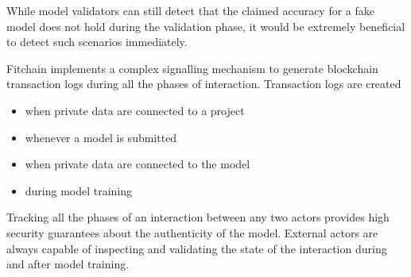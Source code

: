\documentclass[12pt, a4paper,titlepage]{extreport}
\begin{document}
While model validators can still detect that the claimed accuracy for a fake model does not hold during the validation phase, it would be extremely beneficial to detect such scenarios immediately. 

Fitchain implements a complex signalling mechanism to generate blockchain transaction logs during all the phases of interaction. Transaction logs are created  

\begin{itemize}
\item when private data are connected to a project
\item whenever a model is submitted
\item when private data are connected to the model 
\item during model training 
\end{itemize}

Tracking all the phases of an interaction between any two actors provides high security guarantees about the authenticity of the model. External actors are always capable of inspecting and validating the state of the interaction during and after model training.







 



\end{document}
